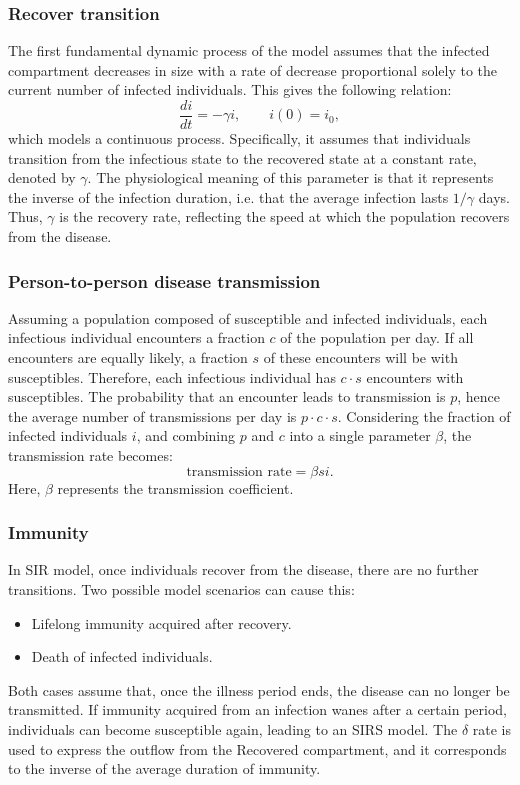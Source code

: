 \subsubsection{Recover transition} 
The first fundamental dynamic process of the model assumes that the infected compartment decreases in size with a rate of decrease proportional solely to the current number of infected individuals. This gives the following relation:
\[\frac{d i}{dt} = - \gamma i, \qquad i(0) = i_0, \]
which models a continuous process. Specifically, it assumes that individuals transition from the infectious state to the recovered state at a constant rate, denoted by $\gamma$. The physiological meaning of this parameter is that it represents the inverse of the infection duration, i.e. that the average infection lasts $1/\gamma$ days. Thus, $\gamma$ is the recovery rate, reflecting the speed at which the population recovers from the disease.
 
\subsubsection{Person-to-person disease transmission}
\label{subsubsec:p2p_transmission}
Assuming a population composed of susceptible and infected individuals, each infectious individual encounters a fraction $c$ of the population per day. If all encounters are equally likely, a fraction $s$ of these encounters will be with susceptibles. Therefore, each infectious individual has $c\cdot s$ encounters with susceptibles. The probability that an encounter leads to transmission is $p$, hence the average number of transmissions per day is $p \cdot c \cdot s$. Considering the fraction of infected individuals $i$, and combining $p$ and $c$ into a single parameter $\beta$, the transmission rate becomes:
\[\text{transmission rate} = \beta s i.\]
Here, $\beta$ represents the transmission coefficient.


\subsubsection{Immunity}
In SIR model, once individuals recover from the disease, there are no further transitions. Two possible model scenarios can cause this:
\begin{itemize}
	\item Lifelong immunity acquired after recovery.
	\item Death of infected individuals.
\end{itemize}
Both cases assume that, once the illness period ends, the disease can no longer be transmitted.
If immunity acquired from an infection wanes after a certain period, individuals can become susceptible again, leading to an SIRS model. The $\delta$ rate is used to express the outflow from the Recovered compartment, and it corresponds to the inverse of the average duration of immunity.

